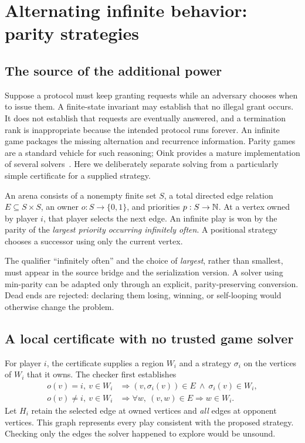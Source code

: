 \section{Alternating infinite behavior: parity strategies}
\label{sec:parity}

\subsection{The source of the additional power}

Suppose a protocol must keep granting requests while an adversary chooses when
to issue them. A finite-state invariant may establish that no illegal grant
occurs. It does not establish that requests are eventually answered, and a
termination rank is inappropriate because the intended protocol runs forever.
An infinite game packages the missing alternation and recurrence information.
Parity games are a standard vehicle for such reasoning; Oink provides a mature
implementation of several solvers~\cite{oink}. Here we deliberately separate
solving from a particularly simple certificate for a supplied strategy.

\begin{definition}
An arena consists of a nonempty finite set $S$, a total directed edge relation
$E\subseteq S\times S$, an owner $o:S\to\{0,1\}$, and priorities
$p:S\to\mathbb{N}$. At a vertex owned by player $i$, that player selects the next edge.
An infinite play is won by the parity of the \emph{largest priority occurring
infinitely often}. A positional strategy chooses a successor using only the
current vertex.
\end{definition}

The qualifier ``infinitely often'' and the choice of \emph{largest}, rather than
smallest, must appear in the source bridge and the serialization version. A
solver using min-parity can be adapted only through an explicit,
parity-preserving conversion. Dead ends are rejected: declaring them losing,
winning, or self-looping would otherwise change the problem.

\subsection{A local certificate with no trusted game solver}

For player $i$, the certificate supplies a region $W_i$ and a strategy
$\sigma_i$ on the vertices of $W_i$ that it owns. The checker first establishes
\begin{align}
  o(v)=i,\ v\in W_i &\Longrightarrow
     (v,\sigma_i(v))\in E\ \land\ \sigma_i(v)\in W_i,\label{eq:own}\\
  o(v)\ne i,\ v\in W_i &\Longrightarrow
     \forall w,\ (v,w)\in E\Rightarrow w\in W_i.\label{eq:opp}
\end{align}
Let $H_i$ retain the selected edge at owned vertices and \emph{all} edges at
opponent vertices. This graph represents every play consistent with the
proposed strategy. Checking only the edges the solver happened to explore would
be unsound.

